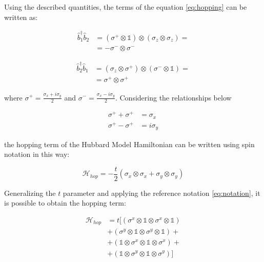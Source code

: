\documentclass[twoside,twocolumn]{article}
\begin{document}
Using the described quantities, the terms of the equation \ref{eq:hopping} can be written as:

\begin{equation}
\begin{aligned}
\hat{b}^\dagger_1 \hat{b}_2 &= (\sigma^+ \otimes \mathbb{1}) \otimes (\sigma_z \otimes \sigma_z) =\\
&= -\sigma^- \otimes \sigma^-
\end{aligned}
\end{equation}

\begin{equation}
\begin{aligned}
\hat{b}^\dagger_2 \hat{b}_1 &= (\sigma_z \otimes \sigma^+) \otimes (\sigma^- \otimes \mathbb{1}) =\\
&= \sigma^+ \otimes \sigma^+
\end{aligned}
\end{equation}

where $\sigma^+ = \frac{\sigma_x+i\sigma_y}{2}$ and $\sigma^- = \frac{\sigma_x-i\sigma_y}{2}$.
Considering the relationships below

\begin{equation}
\begin{aligned}
\sigma^+ + \sigma^+ &= \sigma_x\\
\sigma^+ - \sigma^+ &= i\sigma_y
\end{aligned}
\end{equation}

the hopping term of the Hubbard Model Hamiltonian can be written using spin notation in this way:

\begin{equation} \label{eq:hopping_solution}
\mathcal{H}_{hop} = -\frac{t}{2}(\sigma_x \otimes \sigma_x + \sigma_y \otimes \sigma_y)
\end{equation}

Generalizing the $t$ parameter and applying the reference notation \ref{eq:notation}, it is possible to obtain the hopping term:

\begin{equation}\label{eq:hopping_solution2}
\begin{aligned}
\mathcal{H}_{hop} &= t [ (\sigma^x \otimes \mathbb{1} \otimes \sigma^x \otimes \mathbb{1}) \\
&+ (\sigma^y \otimes \mathbb{1} \otimes \sigma^y \otimes \mathbb{1}) +\\
&+ (\mathbb{1} \otimes \sigma^x \otimes \mathbb{1} \otimes \sigma^x) +\\
&+ (\mathbb{1} \otimes \sigma^y \otimes \mathbb{1} \otimes \sigma^y) ]
\end{aligned}
\end{equation}\\
\end{document}
